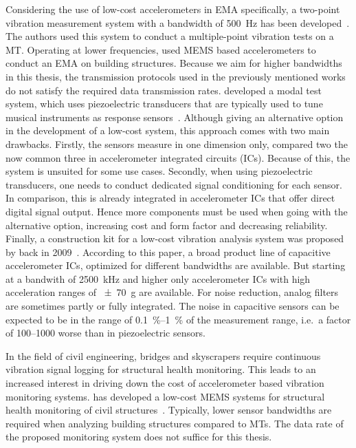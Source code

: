 Considering the use of low-cost accelerometers in \ac{EMA} specifically, a two-point vibration measurement system with a bandwidth of \SI{500}{\hertz} has been developed~\cite{chan2017multiple}. The authors \citeauthor{chan2017multiple} used this system to conduct a multiple-point vibration tests on a \ac{MT}. Operating at lower frequencies, \citeauthor{beskhyroun2012low} used \ac{MEMS} based accelerometers to conduct an \ac{EMA} on building structures. Because we aim for higher bandwidths in this thesis, the transmission protocols used in the previously mentioned works do not satisfy the required data transmission rates. \citeauthor{piana2016experimental} developed a modal test system, which uses piezoelectric transducers that are typically used to tune musical instruments as response sensors~\cite{piana2016experimental}. Although giving an alternative option in the development of a low-cost system, this approach comes with two main drawbacks. Firstly, the sensors measure in one dimension only, compared two the now common three in accelerometer integrated circuits (\acs{IC}s). Because of this, the system is unsuited for some use cases. Secondly, when using piezoelectric transducers, one needs to conduct dedicated signal conditioning for each sensor. In comparison, this is already integrated in accelerometer \ac{IC}s that offer direct digital signal output. Hence more components must be used when going with the alternative option, increasing cost and form factor and decreasing reliability. Finally, a construction kit for a low-cost vibration analysis system was proposed by \citeauthor{vollmer2009construction} back in 2009~\cite{vollmer2009construction}. According to this paper, a broad product line of capacitive accelerometer \ac{IC}s, optimized for different bandwidths are available. But starting at a bandwith of \SI{2500}{\kilo\hertz} and higher only accelerometer \ac{IC}s with high acceleration ranges of \SI{\pm 70}{g} are available. For noise reduction, analog filters are sometimes partly or fully integrated. The noise in capacitive sensors can be expected to be in the range of \SIrange{0.1}{1}{\percent} of the measurement range, i.e.\ a factor of \SIrange{100}{1000}{\relax} worse than in piezoelectric sensors.

In the field of civil engineering, bridges and skyscrapers require continuous vibration signal logging for structural health monitoring. This leads to an increased interest in driving down the cost of accelerometer based vibration monitoring systems. \citeauthor{girolami2018modal} has developed a low-cost \ac{MEMS} systems for structural health monitoring of civil structures~\cite{girolami2018modal}. Typically, lower sensor bandwidths are required when analyzing building structures compared to \ac{MT}s. The data rate of the proposed monitoring system does not suffice for this thesis.

